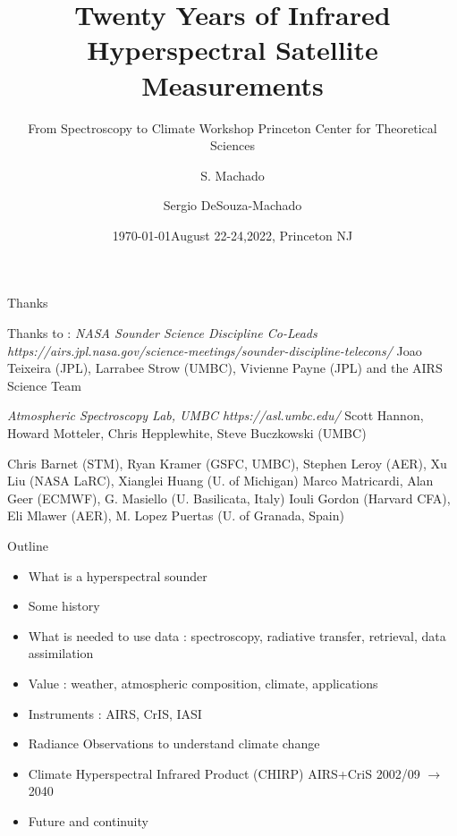 \documentclass[10pt,t]{beamer}
\author{S. Machado}
\date{\today}
\title{\large Twenty Years of Infrared Hyperspectral Satellite Measurements}
\subtitle{\footnotesize{From Spectroscopy to Climate Workshop \newline Princeton Center for Theoretical Sciences}}
\date{\vspace{0.1in}\footnotesize{August 22-24,2022, Princeton NJ \vfill}}
\author{Sergio DeSouza-Machado\inst{1}}
\institute[UMBC]{\inst{1}UMBC JCET}
\begin{document}
\maketitle


\begin{frame}[shrink=2]{Thanks}
\begin{block}{Thanks to :}
\vspace{0.25in}
\emph{NASA Sounder Science Discipline Co-Leads} \newline
\emph{https://airs.jpl.nasa.gov/science-meetings/sounder-discipline-telecons/} \newline
  Joao Teixeira (JPL), Larrabee Strow (UMBC), Vivienne Payne (JPL) \newline
and the AIRS Science Team

\vspace{0.25in}
\emph{Atmospheric Spectroscopy Lab, UMBC https://asl.umbc.edu/ } \newline
Scott Hannon, Howard Motteler, Chris Hepplewhite, Steve Buczkowski (UMBC) \newline

\vspace{0.25in}
Chris Barnet (STM), Ryan Kramer (GSFC, UMBC), Stephen Leroy (AER), Xu Liu (NASA LaRC), Xianglei Huang (U. of Michigan) \newline
Marco Matricardi, Alan Geer (ECMWF), G. Masiello (U. Basilicata, Italy)  \newline
Iouli Gordon (Harvard CFA), Eli Mlawer (AER), M. Lopez Puertas (U. of Granada, Spain)
\end{block}
\end{frame}

\begin{frame}[shrink=2]{Outline}
\begin{itemize}
  \item What is a hyperspectral sounder    
  \item Some history
  \item What is needed to use data : spectroscopy, radiative transfer, retrieval, data assimilation
  \item Value : weather, atmospheric composition, climate, applications
  \item Instruments : AIRS, CrIS, IASI
  \item Radiance Observations to understand climate change
  \item Climate Hyperspectral Infrared Product (CHIRP) AIRS+CriS 2002/09 $\rightarrow$ 2040
  \item Future and continuity
\end{itemize}
\end{frame}
\end{document}
